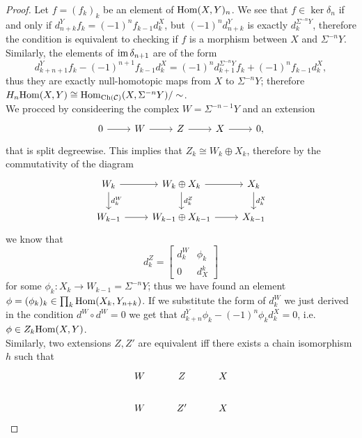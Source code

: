 \begin{proof}
    Let $f=(f_k)_k$ be an element of $\mathrm{Hom}(X,Y)_n$. We see that $f \in \ker \delta_n$ if and only if $d^Y_{n+k} f_k = (-1)^n f_{k-1}d^X_k $, but $(-1)^n d^Y_{n+k}$ is exactly $d^{\Sigma^{-n} Y}_k$, therefore the condition is equivalent to checking if $f$ is a morphism between $X$ and $\Sigma^{-n} Y$. Similarly, the elements of $\operatorname{im} \delta_{n+1}$ are of the form 
    \[d^Y_{k+n+1}f_k - (-1)^{n+1}f_{k-1}d^X_k = (-1)^n d^{\Sigma^{-n} Y}_{k+1}f_k + (-1)^n f_{k-1}d^X_k,\]
    thus they are exactly null-homotopic maps from $X$ to $\Sigma^{-n}Y$; therefore $H_n\mathrm{Hom}(X,Y) \cong  \mathrm{Hom}_{\mathrm{Ch}(\mathcal{C})}(X, \Sigma^{-n} Y) / \sim$. \\
    We procced by consideering the complex $W = \Sigma^{-n-1} Y$ and an extension
    \[\begin{tikzcd}
        0 & W & Z & X & {0,}
        \arrow[from=1-1, to=1-2]
        \arrow[from=1-2, to=1-3]
        \arrow[from=1-3, to=1-4]
        \arrow[from=1-4, to=1-5]
    \end{tikzcd}\]
    that is split degreewise. This implies that $Z_k \cong W_k \oplus X_k$, therefore by the commutativity of the diagram
    \[\begin{tikzcd}
        {W_k} & {W_k\oplus X_k} & {X_k} \\
        {W_{k-1}} & {W_{k-1} \oplus X_{k-1}} & {X_{k-1}}
        \arrow[from=1-1, to=1-2]
        \arrow["{d^W_k}", from=1-1, to=2-1]
        \arrow[from=1-2, to=1-3]
        \arrow["{d^Z_k}", from=1-2, to=2-2]
        \arrow["{d^X_k}", from=1-3, to=2-3]
        \arrow[from=2-1, to=2-2]
        \arrow[from=2-2, to=2-3]
    \end{tikzcd}\]
    we know that 
    \[d_k^Z =  \begin{bmatrix}
        d_k^W & \phi_k \\
        0 & d^k_X 
        \end{bmatrix}  \]
    for some $\phi_k \colon X_k \longrightarrow W_{k-1} = \Sigma^{-n} Y$; thus we have found an element $\phi = (\phi_k)_k \in \prod_{k} \mathrm{Hom}(X_k, Y_{n+k})$. If we substitute the form of $d^W_k$ we just derived in the condition $d^W \circ d^W = 0$ we get that $d^Y_{k+n} \phi_k - (-1)^n \phi_k d_k^X = 0$, i.e. $\phi \in Z_k \mathrm{Hom}(X,Y)$.\\
    Similarly, two extensions $Z, Z'$ are equivalent iff there exists a chain isomorphism $h$ such that
    \[\begin{tikzcd}
        {W} & {Z} & {X} \\
        {W} & {Z'} & {X}

\end{tikzcd}\]
\end{proof}
